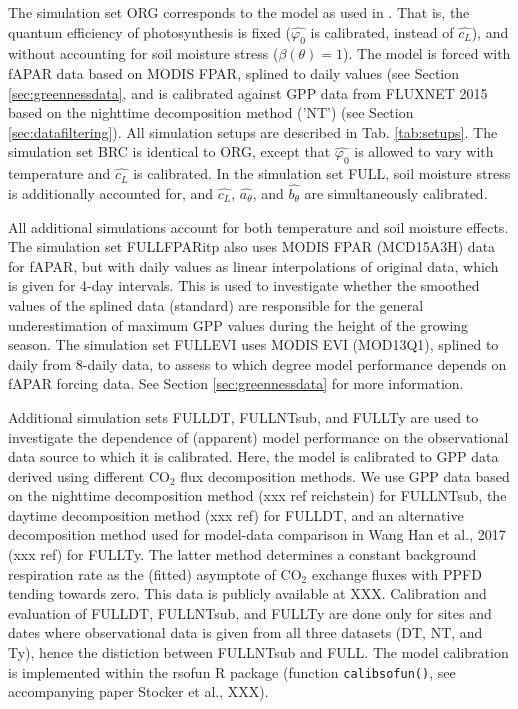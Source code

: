 \documentclass{myreport}
\begin{document}
The simulation set ORG corresponds to the model as used in \cite{wang17natpl}. That is, the quantum efficiency of photosynthesis is fixed ($\widehat{\varphi_0}$ is calibrated, instead of $\widehat{c_L}$), and without accounting for soil moisture stress ($\beta (\theta)=1$). The model is forced with fAPAR data based on MODIS FPAR, splined to daily values (see Section \ref{sec:greennessdata}, and is calibrated against GPP data from FLUXNET 2015 based on the nighttime decomposition method ('NT') (see Section \ref{sec:datafiltering}). All simulation setups are described in Tab. \ref{tab:setups}. The simulation set BRC is identical to ORG, except that  $\widehat{\varphi_0}$ is allowed to vary with temperature and $\widehat{c_L}$ is calibrated. In the simulation set FULL, soil moisture stress is additionally accounted for, and $\widehat{c_L}$, $\widehat{a_{\theta}}$, and $\widehat{b_{\theta}}$ are simultaneously calibrated.

All additional simulations account for both temperature and soil moisture effects. The simulation set FULL\textunderscore FPARitp also uses MODIS FPAR (MCD15A3H) data for fAPAR, but with daily values as linear interpolations of original data, which is given for 4-day intervals. This is used to investigate whether the smoothed values of the splined data (standard) are responsible for the general underestimation of maximum GPP values during the height of the growing season. The simulation set FULL\textunderscore EVI uses MODIS EVI (MOD13Q1), splined to daily from 8-daily data, to assess to which degree model performance depends on fAPAR forcing data. See Section \ref{sec:greennessdata} for more information.

Additional simulation sets FULL\textunderscore DT, FULL\textunderscore NTsub, and FULL\textunderscore Ty are used to investigate the dependence of (apparent) model performance on the observational data source to which it is calibrated. Here, the model is calibrated to GPP data derived using different CO$_2$ flux decomposition methods. We use GPP data based on the nighttime decomposition method (xxx ref reichstein) for FULL\textunderscore NTsub, the daytime decomposition method (xxx ref) for FULL\textunderscore DT, and an alternative decomposition method used for model-data comparison in Wang Han et al., 2017 (xxx ref) for FULL\textunderscore Ty. The latter method determines a constant background respiration rate as the (fitted) asymptote of CO$_2$ exchange fluxes with PPFD tending towards zero. This data is publicly available at XXX. Calibration and evaluation of FULL\textunderscore DT, FULL\textunderscore NTsub, and FULL\textunderscore Ty are done only for sites and dates where observational data is given from all three datasets (DT, NT, and Ty), hence the distiction between FULL\textunderscore NTsub and FULL. The model calibration is implemented within the rsofun R package (function \texttt{calib\textunderscore sofun()}, see accompanying paper Stocker et al., XXX).
\end{document}
